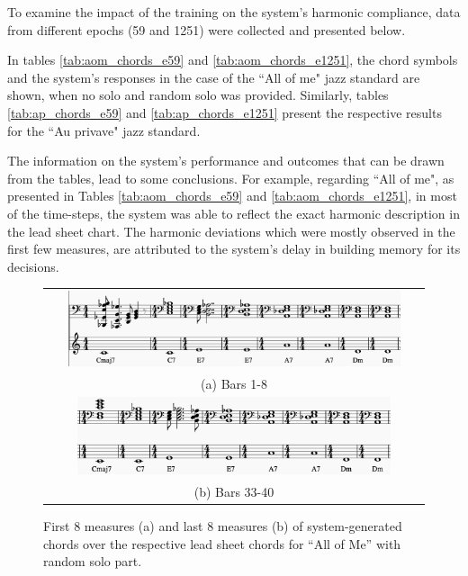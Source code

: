     To examine the impact of the training on the system's harmonic compliance, data from different epochs (59 and 1251) were collected and presented below. 
    
    
    
    
    
        
    
    In tables \ref{tab:aom_chords_e59} and \ref{tab:aom_chords_e1251}, the chord symbols and the system's responses in the case of the ``All of me" jazz standard are shown, when no solo and random solo was provided. Similarly, tables \ref{tab:ap_chords_e59} and \ref{tab:ap_chords_e1251} present the respective results for the ``Au privave" jazz standard.

    The information on the system's performance and outcomes that can be drawn from the tables, lead to some conclusions. For example, regarding ``All of me", as presented in Tables \ref{tab:aom_chords_e59} and \ref{tab:aom_chords_e1251}, in most of the time-steps, the system was able to reflect the exact harmonic description in the lead sheet chart. The harmonic deviations which were mostly observed in the first few measures, are attributed to the system's delay in building memory for its decisions.
   

    \begin{figure}[!htb] 
    \centering
    \begin{tabular}{c}
        \includegraphics[width=0.9\textwidth]{media/aom_rand_bars1-8.png} \\
        (a) Bars 1-8 \\
        \includegraphics[width=0.85\textwidth]{media/aom_rand_bars33-40.png} \\
        (b) Bars 33-40
    \end{tabular}
    \caption{First 8 measures (a) and last 8 measures (b) of system-generated chords over the respective lead sheet chords for ``All of Me'' with random solo part.}
    \label{fig:aom_beginning_comparison}
    \end{figure}

